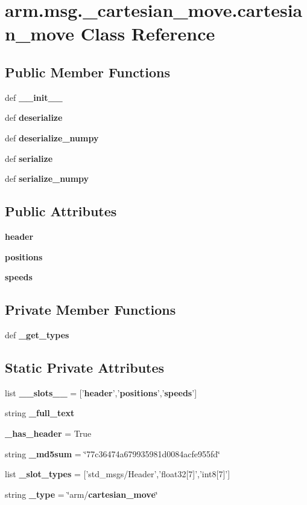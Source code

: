 \section{arm.\-msg.\-\_\-cartesian\-\_\-move.\-cartesian\-\_\-move \-Class \-Reference}
\label{classarm_1_1msg_1_1__cartesian__move_1_1cartesian__move}
\subsection*{\-Public \-Member \-Functions}
\begin{DoxyCompactItemize}
\item 
def {\bf \-\_\-\-\_\-init\-\_\-\-\_\-}
\item 
def {\bf deserialize}
\item 
def {\bf deserialize\-\_\-numpy}
\item 
def {\bf serialize}
\item 
def {\bf serialize\-\_\-numpy}
\end{DoxyCompactItemize}
\subsection*{\-Public \-Attributes}
\begin{DoxyCompactItemize}
\item 
{\bf header}
\item 
{\bf positions}
\item 
{\bf speeds}
\end{DoxyCompactItemize}
\subsection*{\-Private \-Member \-Functions}
\begin{DoxyCompactItemize}
\item 
def {\bf \-\_\-get\-\_\-types}
\end{DoxyCompactItemize}
\subsection*{\-Static \-Private \-Attributes}
\begin{DoxyCompactItemize}
\item 
list {\bf \-\_\-\-\_\-slots\-\_\-\-\_\-} = ['{\bf header}','{\bf positions}','{\bf speeds}']
\item 
string {\bf \-\_\-full\-\_\-text}
\item 
{\bf \-\_\-has\-\_\-header} = \-True
\item 
string {\bf \-\_\-md5sum} = \char`\"{}77c36474a679935981d0084acfe955fd\char`\"{}
\item 
list {\bf \-\_\-slot\-\_\-types} = ['std\-\_\-msgs/\-Header','float32[7]','int8[7]']
\item 
string {\bf \-\_\-type} = \char`\"{}arm/{\bf cartesian\-\_\-move}\char`\"{}
\end{DoxyCompactItemize}


